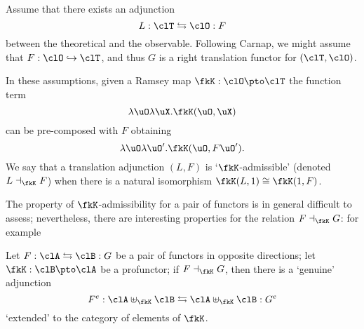 \begin{remark}\label{carnap_translation_functors}
	Assume that there exists an adjunction 
	\[ 
		L : \clT \leftrightarrows \clO : F
	\]
	between the theoretical and the observable. Following Carnap, we might assume that $F : \clO \hookrightarrow \clT$, and thus $G$ is a right translation functor for $(\clT, \clO)$.

	In these assumptions, given a Ramsey map $\fkK : \clO \pto\clT$ the function term
	\[\lambda \uO\lambda\uX . \fkK(\uO, \uX)\]
	can be pre-composed with $F$ obtaining
	\[\lambda \uO\lambda\uO'.\fkK(\uO, F\uO').\]
	We say that a translation adjunction $(L,F)$ is `$\fkK$-admissible' (denoted $L \dashv_\fkK F$) when there is a natural isomorphism $\fkK(L,1)\cong\fkK(1,F)$.
\end{remark}
The property of $\fkK$-admissibility for a pair of functors is in general difficult to assess; nevertheless, there are interesting properties for the relation $F\dashv_\fkK G$: for example
\begin{theorem}
	Let $F : \clA \leftrightarrows \clB: G$ be a pair of functors in opposite directions; let $\fkK : \clB \pto \clA$ be a profunctor; if $F\dashv_\fkK G$, then there is a `genuine' adjunction 
	\[ F^e : \clA\uplus_\fkK\clB \leftrightarrows \clA\uplus_\fkK\clB : G^e \]
	`extended' to the category of elements of $\fkK$.
\end{theorem}